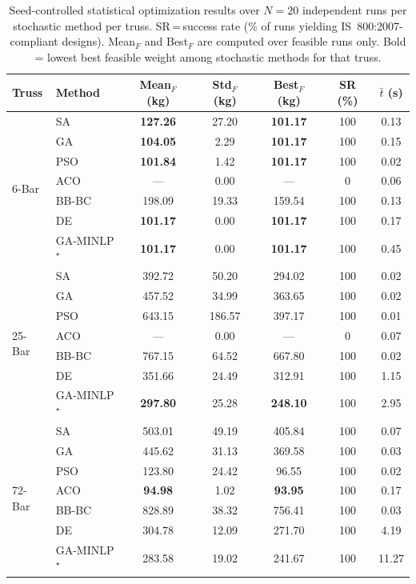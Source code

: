 \begin{table}[tbp]\centering
\caption{Seed-controlled statistical optimization results over $N=20$ independent runs per stochastic method per truss. SR\,=\,success rate (\% of runs yielding IS~800:2007-compliant designs). Mean$_F$ and Best$_F$ are computed over feasible runs only. Bold = lowest best feasible weight among stochastic methods for that truss.}
\label{tab:statistical}
\begin{tabular}{@{}llccccc@{}}
\toprule
\textbf{Truss} & \textbf{Method} & \textbf{Mean}$_F$ (kg) & \textbf{Std}$_F$ (kg) & \textbf{Best}$_F$ (kg) & \textbf{SR} (\%) & $\bar{t}$ (s) \\
\midrule
\multirow{7}{*}{6-Bar} & SA & \textbf{127.26} & 27.20 & \textbf{101.17} & 100 & 0.13 \\
 & GA & \textbf{104.05} & 2.29 & \textbf{101.17} & 100 & 0.15 \\
 & PSO & \textbf{101.84} & 1.42 & \textbf{101.17} & 100 & 0.02 \\
 & ACO & --- & 0.00 & --- & 0 & 0.06 \\
 & BB-BC & 198.09 & 19.33 & 159.54 & 100 & 0.13 \\
 & DE & \textbf{101.17} & 0.00 & \textbf{101.17} & 100 & 0.17 \\
 & GA-MINLP$^\star$ & \textbf{101.17} & 0.00 & \textbf{101.17} & 100 & 0.45 \\
\midrule
\multirow{7}{*}{25-Bar} & SA & 392.72 & 50.20 & 294.02 & 100 & 0.02 \\
 & GA & 457.52 & 34.99 & 363.65 & 100 & 0.02 \\
 & PSO & 643.15 & 186.57 & 397.17 & 100 & 0.01 \\
 & ACO & --- & 0.00 & --- & 0 & 0.07 \\
 & BB-BC & 767.15 & 64.52 & 667.80 & 100 & 0.02 \\
 & DE & 351.66 & 24.49 & 312.91 & 100 & 1.15 \\
 & GA-MINLP$^\star$ & \textbf{297.80} & 25.28 & \textbf{248.10} & 100 & 2.95 \\
\midrule
\multirow{7}{*}{72-Bar} & SA & 503.01 & 49.19 & 405.84 & 100 & 0.07 \\
 & GA & 445.62 & 31.13 & 369.58 & 100 & 0.03 \\
 & PSO & 123.80 & 24.42 & 96.55 & 100 & 0.02 \\
 & ACO & \textbf{94.98} & 1.02 & \textbf{93.95} & 100 & 0.17 \\
 & BB-BC & 828.89 & 38.32 & 756.41 & 100 & 0.03 \\
 & DE & 304.78 & 12.09 & 271.70 & 100 & 4.19 \\
 & GA-MINLP$^\star$ & 283.58 & 19.02 & 241.67 & 100 & 11.27 \\
\bottomrule
\end{tabular}
\end{table}